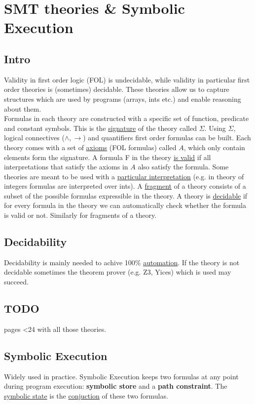 \chapter{SMT theories \& Symbolic Execution}
\section{Intro}
Validity in first order logic (FOL) is undecidable, while validity in particular first order theories is (sometimes) decidable. These theories allow us to capture structures which are used by programs (arrays, ints etc.) and enable reasoning about them. \\
Formulas in each theory are constructed with a specific set of function, predicate and constant symbols. This is the \underline{signature} of the theory called $\Sigma$. Using $\Sigma$, logical connectives ($\wedge, \to$) and quantifiers first order formulas can be built. Each theory comes with a set of \underline{axioms} (FOL formulas) called $A$, which only contain elements form the signature. A formula F in the theory \underline{is valid} if all interpretations that satisfy the axioms in $A$ also satisfy the formula. Some theories are meant to be used with a \underline{particular interpretation} (e.g. in theory of integers formulas are interpreted over ints). A \underline{fragment} of a theory consists of a subset of the possible formulas expressible in the theory. A theory is \underline{decidable} if for every formula in the theory we can automatically check whether the formula is valid or not. Similarly for fragments of a theory.
\section{Decidability}
Decidability is mainly needed to achive 100\% \underline{automation}. If the theory is not decidable sometimes the theorem prover (e.g. Z3, Yices) which is used may succeed.

\section{TODO}
pages <24 with all those theories.
\section{Symbolic Execution}
Widely used in practice. Symbolic Execution keeps two formulas at any point during program execution: \textbf{symbolic store} and a \textbf{path constraint}. The \underline{symbolic state} is the \underline{conjuction} of these two formulas.
